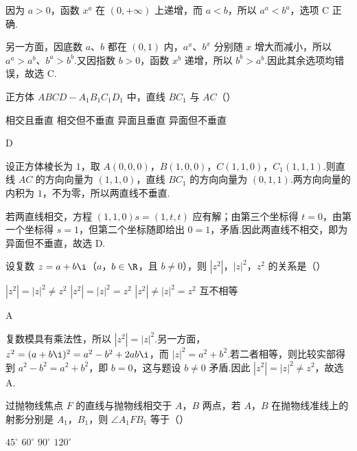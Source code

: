 \begin{solution}
因为 \(a>0\)，函数 \(x^a\) 在 \((0,+\infty)\) 上递增，而 \(a<b\)，所以
\(a^a<b^a\)，选项 C 正确.

另一方面，因底数 \(a\)、\(b\) 都在 \((0,1)\) 内，\(a^x\)、\(b^x\) 分别随 \(x\) 增大而减小，所以
\(a^a>a^b\)、\(b^a>b^b\).又因指数 \(b>0\)，函数 \(x^b\) 递增，所以 \(b^b>a^b\).因此其余选项均错误，故选 C.
\end{solution}

\begin{problem}

正方体 \(ABCD-A_1B_1C_1D_1\) 中，直线 \(BC_1\) 与 \(AC\)（\quad）

\choices
    {相交且垂直}
    {相交但不垂直}
    {异面且垂直}
    {异面但不垂直}
\end{problem}

\begin{answer}
D
\end{answer}

\begin{solution}
设正方体棱长为 \(1\)，取
\(A(0,0,0)\)，\(B(1,0,0)\)，\(C(1,1,0)\)，\(C_1(1,1,1)\).则直线 \(AC\) 的方向向量为 \((1,1,0)\)，直线 \(BC_1\) 的方向向量为 \((0,1,1)\).两方向向量的内积为 \(1\)，不为零，所以两直线不垂直.

若两直线相交，方程 \((1,1,0)s=(1,t,t)\) 应有解；由第三个坐标得 \(t=0\)，由第一个坐标得 \(s=1\)，但第二个坐标随即给出 \(0=1\)，矛盾.因此两直线不相交，即为异面但不垂直，故选 D.
\end{solution}

\begin{problem}

设复数 \(z=a+b\i\)（\(a\)，\(b\in\R\)，且 \(b\ne 0\)），则 \(|z^2|\)，\(|z|^2\)，\(z^2\) 的关系是（\quad）

\choices
    {\(|z^2|=|z|^2\ne z^2\)}
    {\(|z^2|=|z|^2=z^2\)}
    {\(|z^2|\ne |z|^2=z^2\)}
    {互不相等}
\end{problem}

\begin{answer}
A
\end{answer}

\begin{solution}
复数模具有乘法性，所以
\(|z^2|=|z|^2\).另一方面，
\(z^2=(a+b\i)^2=a^2-b^2+2ab\i\)，而
\(|z|^2=a^2+b^2\).若二者相等，则比较实部得到 \(a^2-b^2=a^2+b^2\)，即 \(b=0\)，这与题设 \(b\ne0\) 矛盾.因此 \(|z^2|=|z|^2\ne z^2\)，故选 A.
\end{solution}

\begin{problem}

过抛物线焦点 \(F\) 的直线与抛物线相交于 \(A\)，\(B\) 两点，若 \(A\)，\(B\) 在抛物线准线上的射影分别是 \(A_1\)，\(B_1\)，则 \(\angle A_1FB_1\) 等于（\quad）

\choices
    {\(45^\circ\)}
    {\(60^\circ\)}
    {\(90^\circ\)}
    {\(120^\circ\)}
\end{problem}

